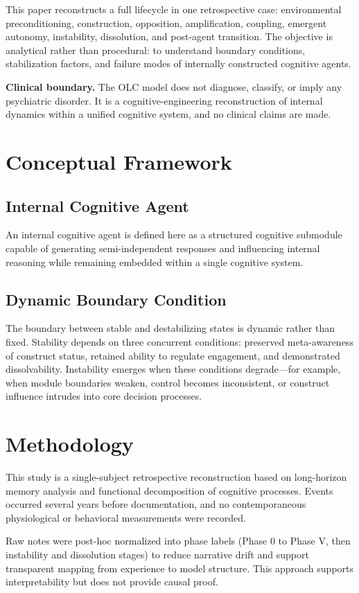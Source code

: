 \documentclass[11pt]{article}
\begin{document}
This paper reconstructs a full lifecycle in one retrospective case: environmental preconditioning, construction, opposition, amplification, coupling, emergent autonomy, instability, dissolution, and post-agent transition. The objective is analytical rather than procedural: to understand boundary conditions, stabilization factors, and failure modes of internally constructed cognitive agents.

\textbf{Clinical boundary.} The OLC model does not diagnose, classify, or imply any psychiatric disorder. It is a cognitive-engineering reconstruction of internal dynamics within a unified cognitive system, and no clinical claims are made.

\section{Conceptual Framework}
\subsection{Internal Cognitive Agent}
An internal cognitive agent is defined here as a structured cognitive submodule capable of generating semi-independent responses and influencing internal reasoning while remaining embedded within a single cognitive system.

\subsection{Dynamic Boundary Condition}
The boundary between stable and destabilizing states is dynamic rather than fixed. Stability depends on three concurrent conditions: preserved meta-awareness of construct status, retained ability to regulate engagement, and demonstrated dissolvability. Instability emerges when these conditions degrade---for example, when module boundaries weaken, control becomes inconsistent, or construct influence intrudes into core decision processes.

\section{Methodology}
This study is a single-subject retrospective reconstruction based on long-horizon memory analysis and functional decomposition of cognitive processes. Events occurred several years before documentation, and no contemporaneous physiological or behavioral measurements were recorded.

Raw notes were post-hoc normalized into phase labels (Phase 0 to Phase V, then instability and dissolution stages) to reduce narrative drift and support transparent mapping from experience to model structure. This approach supports interpretability but does not provide causal proof.
\end{document}
